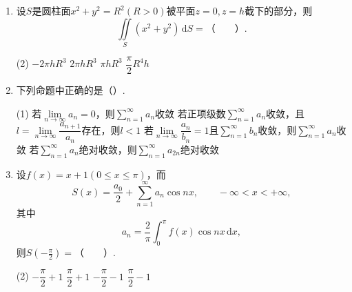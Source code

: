 \documentclass[../Main.tex]{subfiles}
\begin{document}
\begin{enumerate}
  \item 设$S$是圆柱面$x^{2}+y^{2}=R^{2}(R>0)$被平面$z=0,z=h$截下的部分，则
        \[
          \iint\limits_{S}(x^{2}+y^{2})\,\mathrm{d}S=（\qquad）.
        \]

        \begin{tasks}[label=\textbf{\Alph*.}, label-width=1.5em, column-sep=1em](2)
          \task $-2\pi hR^{3}$
          \task $2\pi hR^{3}$
          \task $\pi hR^{3}$
          \task $\dfrac{\pi}{2}R^{4}h$
        \end{tasks}
        \vspace{1em}

  \item 下列命题中正确的是（\qquad）.

        \begin{tasks}[label=\textbf{\Alph*.}, label-width=1.5em, column-sep=1em](1)
          \task 若$\lim\limits_{n\to\infty}a_{n}=0$，则$\sum\limits_{n=1}^{\infty}a_{n}$收敛
          \task 若正项级数$\sum\limits_{n=1}^{\infty}a_{n}$收敛，且$l=\lim\limits_{n\to\infty}\dfrac{a_{n+1}}{a_{n}}$存在，则$l<1$
          \task 若$\lim\limits_{n\to\infty}\dfrac{a_{n}}{b_{n}}=1$且$\sum\limits_{n=1}^{\infty}b_{n}$收敛，则$\sum\limits_{n=1}^{\infty}a_{n}$收敛
          \task 若$\sum\limits_{n=1}^{\infty}a_{n}$绝对收敛，则$\sum\limits_{n=1}^{\infty}a_{2n}$绝对收敛
        \end{tasks}
        \vspace{1em}

  \item 设$f(x)=x+1(0\leq x\leq \pi)$，而
        \[
          S(x)=\frac{a_{0}}{2}+\sum_{n=1}^{\infty}a_{n}\cos nx,\qquad -\infty<x<+\infty,
        \]
        其中
        \[
          a_{n}=\frac{2}{\pi}\int_{0}^{\pi}f(x)\cos nx\,\mathrm{d}x,
        \]
        则$S\left(-\frac{\pi}{2}\right)=（\qquad）$.

        \begin{tasks}[label=\textbf{\Alph*.}, label-width=1.5em, column-sep=1em](2)
          \task $-\dfrac{\pi}{2}+1$
          \task $\dfrac{\pi}{2}+1$
          \task $-\dfrac{\pi}{2}-1$
          \task $\dfrac{\pi}{2}-1$
        \end{tasks}
        \vspace{1em}
\end{enumerate}
\end{document}
